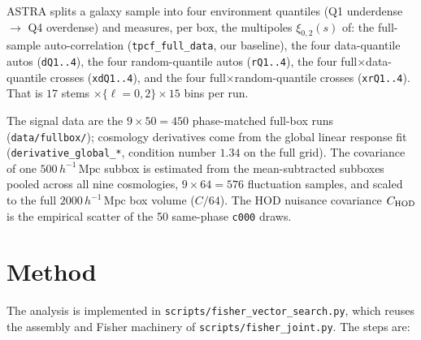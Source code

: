 \documentclass[11pt]{article}
\newcommand{\Mpch}{\,h^{-1}\,\mathrm{Mpc}}
\newcommand{\code}[1]{\texttt{#1}}
\begin{document}
ASTRA splits a galaxy sample into four environment quantiles
(Q1 underdense $\to$ Q4 overdense) and measures, per box, the
multipoles $\xi_{0,2}(s)$ of: the full-sample auto-correlation
(\code{tpcf\_full\_data}, our baseline), the four data-quantile autos
(\code{dQ1..4}), the four random-quantile autos (\code{rQ1..4}), the four
full$\times$data-quantile crosses (\code{xdQ1..4}), and the four
full$\times$random-quantile crosses (\code{xrQ1..4}).  That is
$17$ stems $\times\{\ell=0,2\}\times 15$ bins per run.

The signal data are the $9\times 50 = 450$ phase-matched full-box runs
(\code{data/fullbox/}); cosmology derivatives come from the global linear
response fit (\code{derivative\_global\_*}, condition number $1.34$ on the
full grid).  The covariance of one $500\Mpch$ subbox is estimated from the
mean-subtracted subboxes pooled across all nine cosmologies,
$9\times 64 = 576$ fluctuation samples, and scaled to the full
$2000\Mpch$ box volume ($C/64$).  The HOD nuisance covariance $C_{\rm HOD}$
is the empirical scatter of the 50 same-phase \code{c000} draws.

\section{Method}
\label{sec:method}

The analysis is implemented in \code{scripts/fisher\_vector\_search.py},
which reuses the assembly and Fisher machinery of
\code{scripts/fisher\_joint.py}.  The steps are:
\end{document}
